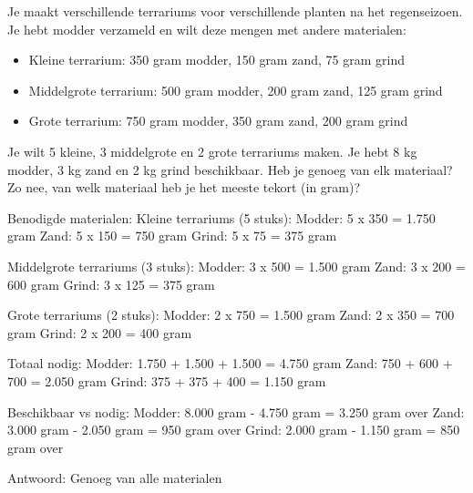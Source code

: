 \begin{opgave}
Je maakt verschillende terrariums voor verschillende planten na het regenseizoen.
Je hebt modder verzameld en wilt deze mengen met andere materialen:

\begin{itemize}
\item Kleine terrarium: 350 gram modder, 150 gram zand, 75 gram grind
\item Middelgrote terrarium: 500 gram modder, 200 gram zand, 125 gram grind
\item Grote terrarium: 750 gram modder, 350 gram zand, 200 gram grind
\end{itemize}

Je wilt 5 kleine, 3 middelgrote en 2 grote terrariums maken. Je hebt 8 kg modder,
3 kg zand en 2 kg grind beschikbaar. Heb je genoeg van elk materiaal? Zo nee,
van welk materiaal heb je het meeste tekort (in gram)?
\end{opgave}

\begin{oplossing}
Benodigde materialen:
Kleine terrariums (5 stuks):
Modder: 5 x 350 = 1.750 gram
Zand: 5 x 150 = 750 gram  
Grind: 5 x 75 = 375 gram

Middelgrote terrariums (3 stuks):
Modder: 3 x 500 = 1.500 gram
Zand: 3 x 200 = 600 gram
Grind: 3 x 125 = 375 gram

Grote terrariums (2 stuks):
Modder: 2 x 750 = 1.500 gram
Zand: 2 x 350 = 700 gram
Grind: 2 x 200 = 400 gram

Totaal nodig:
Modder: 1.750 + 1.500 + 1.500 = 4.750 gram
Zand: 750 + 600 + 700 = 2.050 gram
Grind: 375 + 375 + 400 = 1.150 gram

Beschikbaar vs nodig:
Modder: 8.000 gram - 4.750 gram = 3.250 gram over
Zand: 3.000 gram - 2.050 gram = 950 gram over
Grind: 2.000 gram - 1.150 gram = 850 gram over

Antwoord: Genoeg van alle materialen
\end{oplossing}